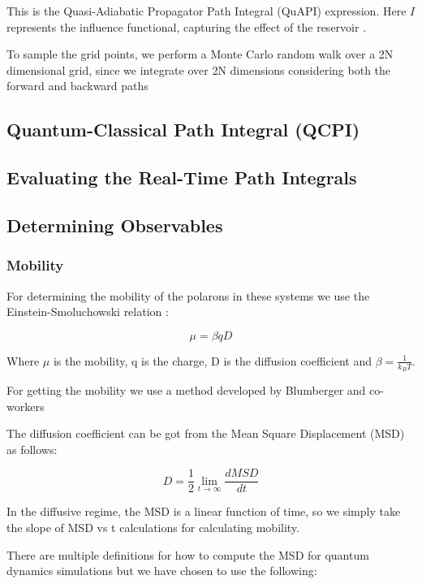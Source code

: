 This is the Quasi-Adiabatic Propagator Path Integral (QuAPI) expression. Here $I$ represents the influence functional, capturing the effect of the reservoir \cite{feynman2000theory}. 

To sample the grid points, we perform a Monte Carlo random walk over a 2N dimensional grid, since we integrate over 2N dimensions considering both the forward and backward paths 

\subsection{Quantum-Classical Path Integral (QCPI)}

\subsection{Evaluating the Real-Time Path Integrals}

\subsection{Determining Observables}

\subsubsection{Mobility}

For determining the mobility of the polarons in these systems we use the Einstein-Smoluchowski relation : 

\begin{equation}
    \mu = \beta qD
\end{equation}

Where $\mu$ is the mobility, q is the charge, D is the diffusion coefficient and $\beta = \frac{1}{k_B T}$. 

For getting the mobility we use a method developed by Blumberger and co-workers \cite{blumberger} 

The diffusion coefficient can be got from the Mean Square Displacement (MSD) as follows: 

\begin{equation}
D = \frac{1}{2} \lim_{t \to \infty} \frac{dMSD}{dt}
\end{equation}

In the diffusive regime, the MSD is a linear function of time, so we simply take the slope of MSD vs t calculations for calculating mobility.

There are multiple definitions for how to compute the MSD for quantum dynamics simulations but we have chosen to use the following:

